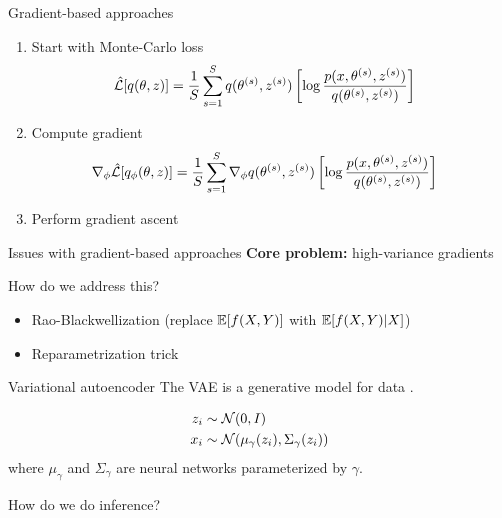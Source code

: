 \documentclass[10pt, compress]{beamer}
\begin{document}
\begin{frame}{Gradient-based approaches}
  \begin{enumerate}
    \item Start with Monte-Carlo loss
      \begin{align*}
        \hat{\mathcal{L}}[q(\theta, z)] &= \frac{1}{S}\sum_{s = 1}^S {q(\theta^{(s)}, z^{(s)})}\left[\log\frac{p(x, \theta^{(s)}, z^{(s)})}{q(\theta^{(s)}, z^{(s)})}\right]
      \end{align*}
    \item Compute gradient
      \begin{align*}
        \nabla_{\phi}\hat{\mathcal{L}}[q_\phi(\theta, z)] &= \frac{1}{S}\sum_{s = 1}^S \nabla_\phi{q(\theta^{(s)}, z^{(s)})}\left[\log\frac{p(x, \theta^{(s)}, z^{(s)})}{q(\theta^{(s)}, z^{(s)})}\right]
      \end{align*}
    \item Perform gradient ascent
  \end{enumerate}
\end{frame}

\begin{frame}{Issues with gradient-based approaches}
  \textbf{Core problem:}  high-variance gradients

  \pause

  How do we address this?

  \begin{itemize}
    \item Rao-Blackwellization (replace $\mathbb{E}[f(X, Y)]$ with $\mathbb{E}[f(X, Y) | X]$)\cite{blackbox}
    \item Reparametrization trick \cite{vae}
  \end{itemize}
\end{frame}

\begin{frame}{Variational autoencoder}
  The VAE is a generative model for data \cite{vae}.

  \begin{align*}
    z_i &\sim  \mathcal{N}(0, I) \\
    x_i &\sim  \mathcal{N}(\mu_\gamma(z_i), \Sigma_\gamma(z_i))
  \end{align*}
  where $\mu_\gamma$ and $\Sigma_\gamma$ are neural networks parameterized by $\gamma$.

  \pause
  \centering
  
  \pause

  How do we do inference?
\end{frame}
\end{document}
